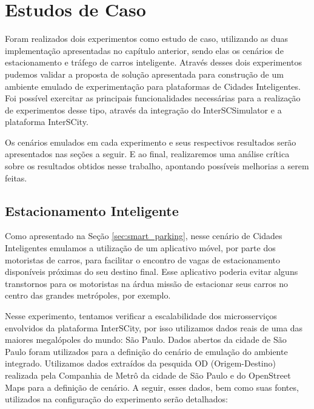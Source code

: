 \chapter{Estudos de Caso}
\label{cap:estudos-de-caso}


Foram realizados dois experimentos como estudo de caso, utilizando as duas implementação apresentadas no capítulo anterior, sendo elas os cenários de estacionamento e tráfego de carros inteligente.
Através desses dois experimentos pudemos validar a proposta de solução apresentada para construção de um ambiente emulado de experimentação para plataformas de Cidades Inteligentes.
Foi possível exercitar as principais funcionalidades necessárias para a realização de experimentos desse tipo, através da integração do InterSCSimulator e a plataforma InterSCity.

Os cenários emulados em cada experimento e seus respectivos resultados serão apresentados nas seções a seguir.
E ao final, realizaremos uma análise crítica sobre os resultados obtidos nesse trabalho, apontando possíveis melhorias a serem feitas.

\section{Estacionamento Inteligente}

Como apresentado na Seção \ref{sec:smart_parking}, nesse cenário de Cidades Inteligentes emulamos a utilização de um aplicativo móvel, por parte dos motoristas de carros, para facilitar o encontro de
vagas de estacionamento disponíveis próximas do seu destino final.
Esse aplicativo poderia evitar alguns transtornos para os motoristas na árdua missão de estacionar seus carros no centro das grandes metrópoles, por exemplo.

Nesse experimento, tentamos verificar a escalabilidade dos microsserviços envolvidos da plataforma InterSCity, por isso utilizamos dados reais de uma das maiores megalópoles do mundo: São Paulo.
Dados abertos da cidade de São Paulo foram utilizados para a definição do cenário de emulação do ambiente integrado.
Utilizamos dados extraídos da pesquida OD (Origem-Destino) realizada pela Companhia de Metrô da cidade de São Paulo e do OpenStreet Maps para a definição de cenário.
A seguir, esses dados, bem como suas fontes, utilizados na configuração do experimento serão detalhados:

